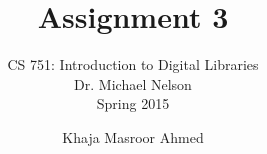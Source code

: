 \documentclass[envcountsame,envcountchap]{svmono}
\begin{document}
\author{Khaja Masroor Ahmed}
\title{Assignment 3}

\subtitle{CS 751:  Introduction to Digital Libraries\\Dr. Michael Nelson\\Spring 2015}

\maketitle

\frontmatter

\tableofcontents

\mainmatter



\backmatter



\nocite{*}
\end{document}
